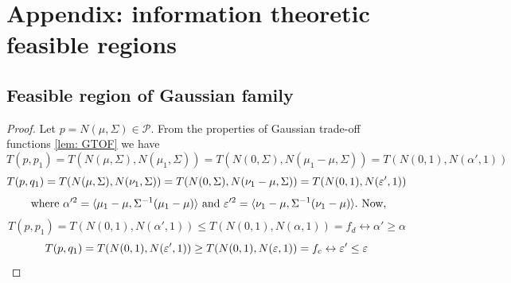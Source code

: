 \section{Appendix: information theoretic feasible regions}
\subsection{Feasible region of Gaussian family}
\FFR*
\begin{proof} \label{proof:FFRG}
Let $p = N(\mu, \Sigma) \in \mathcal{P}$. From the properties of Gaussian trade-off functions \eqref{lem: GTOF} we have  
\begin{equation}
T(p,p_1)= T(N(\mu, \Sigma), N(\mu_1, \Sigma)) = T(N(0,\Sigma), N(\mu_1- \mu, \Sigma)) = T(N(0,1), N(\alpha',1 )) 
\end{equation}
\begin{equation}
    T(p,q_1)= T(N(\mu, \Sigma), N(\nu_1, \Sigma)) = T(N(0,\Sigma), N(\nu_1- \mu, \Sigma)) = T(N(0,1), N(\varepsilon',1 )) 
\end{equation}
\begin{equation} \label{eq:GFRparameters}
\text{ where } \alpha'^2= \langle \mu_1 -\mu, \Sigma^{-1}(\mu_1-\mu) \rangle \text{ and }\varepsilon'^2= \langle \nu_1 -\mu, \Sigma^{-1}(\nu_1-\mu) \rangle. \text{ Now,}
\end{equation}
\begin{equation}
    T(p,p_1) = T(N(0,1), N(\alpha',1 ))  \leq T(N(0,1), N(\alpha,1 )) =f_d \leftrightarrow \alpha' \geq \alpha
\end{equation}
\begin{equation}
    T(p,q_1) = T(N(0,1), N(\varepsilon',1 )) \geq T(N(0,1), N(\varepsilon,1 )) =f_c \leftrightarrow \varepsilon' \leq \varepsilon
\end{equation}


\end{proof}
